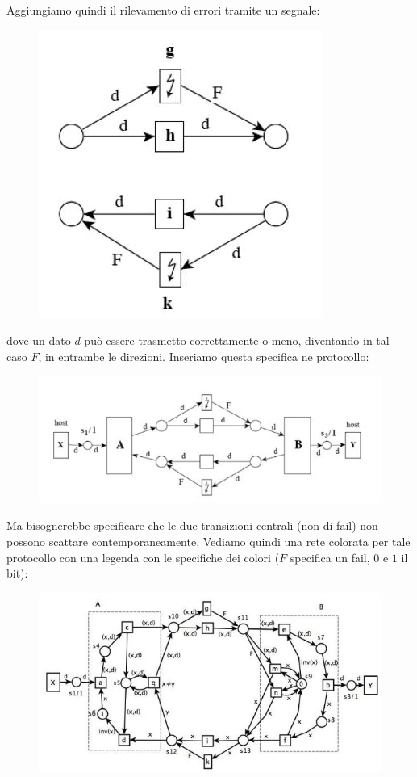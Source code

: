 \documentclass[a4paper,12pt, oneside]{book}
\begin{document}
\newpage
Aggiungiamo quindi il rilevamento di errori tramite un segnale:
\begin{figure}[H]
  \centering
  \includegraphics[scale = 0.5]{img/abt3.jpg}
\end{figure}
dove un dato $d$ può essere trasmetto correttamente o meno, diventando in tal
caso $F$, in entrambe le direzioni. Inseriamo questa specifica ne protocollo:
\begin{figure}[H]
  \centering
  \includegraphics[scale = 0.65]{img/abt4.jpg}
\end{figure}
Ma bisognerebbe specificare che le due transizioni centrali (non di fail) non
possono scattare contemporaneamente.
\newpage
Vediamo quindi una rete colorata per tale protocollo con una legenda con le
specifiche dei colori ($F$ specifica un fail, $0$ e $1$ il bit): 
\begin{figure}[H]
  \centering
  \includegraphics[scale = 0.6]{img/abt5.jpg}
\end{figure}
\end{document}
